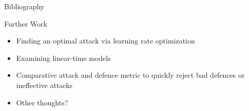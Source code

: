 \documentclass{beamer}
\begin{document}
\begin{frame}{Bibliography}
\scriptsize


\end{frame}

\begin{frame}{Further Work}
    \begin{itemize}
        \item Finding an optimal attack via learning rate optimization
        \item Examining linear-time models
        \item Comparative attack and defence metric to quickly reject bad defences or ineffective attacks
        \item Other thoughts?
    \end{itemize}
\end{frame}
\end{document}
